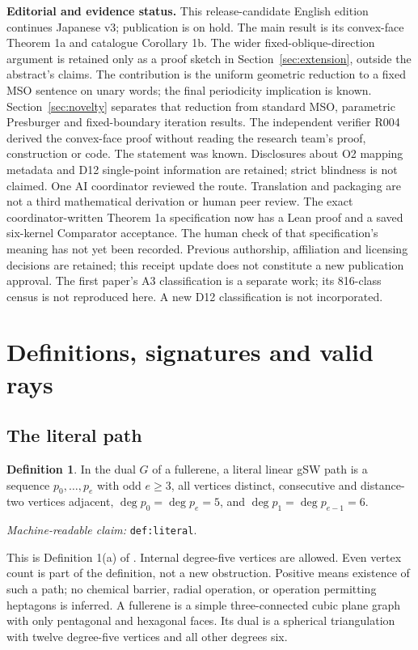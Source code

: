 \documentclass[11pt]{amsart}
\newcommand{\record}[1]{\nolinkurl{#1}}
\newcommand{\claimid}[1]{\par\nopagebreak\noindent\textit{Machine-readable claim:} \record{#1}.\par}
\theoremstyle{definition}\newtheorem{definition}{Definition}
\begin{document}
\noindent\textbf{Editorial and evidence status.}
This release-candidate English edition continues Japanese v3; publication is on hold. The
main result is its convex-face Theorem 1a and catalogue Corollary 1b.
The wider fixed-oblique-direction argument is retained only as a proof
sketch in Section~\ref{sec:extension}, outside the abstract's claims.
The contribution is the uniform geometric reduction to a fixed MSO
sentence on unary words; the final periodicity implication is known.
Section~\ref{sec:novelty} separates that reduction from standard
MSO, parametric Presburger and fixed-boundary iteration results.
The independent verifier R004 derived the convex-face proof without
reading the research team's proof, construction or code. The statement
was known. Disclosures about O2 mapping metadata and D12 single-point
information are retained; strict blindness is not claimed. One AI
coordinator reviewed the route. Translation and packaging are not a
third mathematical derivation or human peer review. The exact
coordinator-written Theorem 1a specification now has a Lean proof
and a saved six-kernel Comparator acceptance. The human check of
that specification's meaning has not yet been recorded. Previous
authorship, affiliation and licensing decisions are retained; this
receipt update does not constitute a new publication approval. The first paper's
A3 classification is a separate work; its 816-class census is not
reproduced here. A new D12 classification is not incorporated.

\clearpage
\section{Definitions, signatures and valid rays}\label{sec:definitions}
\subsection{The literal path}
\begin{definition}\label{def:literal}
In the dual $G$ of a fullerene, a literal linear gSW path is a sequence
$p_0,\ldots,p_e$ with odd $e\ge3$, all vertices distinct, consecutive
and distance-two vertices adjacent, $\deg p_0=\deg p_e=5$, and
$\deg p_1=\deg p_{e-1}=6$.
\end{definition}
\claimid{def:literal}
This is Definition 1(a) of \cite{BBS}. Internal degree-five vertices
are allowed. Even vertex count is part of the definition, not a new
obstruction. Positive means existence of such a path; no chemical
barrier, radial operation, or operation permitting heptagons is inferred.
A fullerene is a simple three-connected cubic plane graph with only
pentagonal and hexagonal faces. Its dual is a spherical triangulation
with twelve degree-five vertices and all other degrees six.
\end{document}
